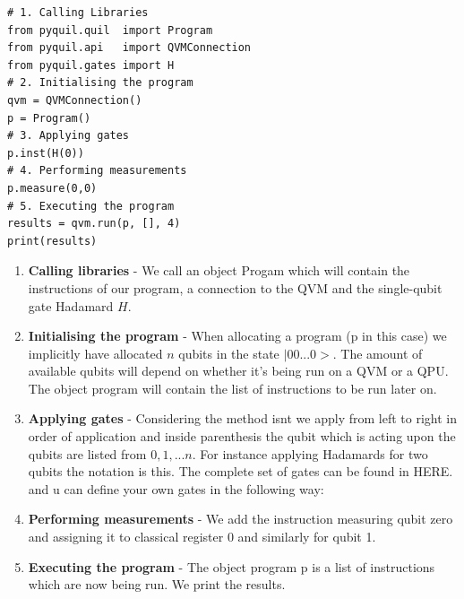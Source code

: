 \noindent \begin{minipage}{0.45\textwidth}
\begin{verbatim}
# 1. Calling Libraries
from pyquil.quil  import Program 
from pyquil.api   import QVMConnection 
from pyquil.gates import H
# 2. Initialising the program
qvm = QVMConnection()
p = Program()
# 3. Applying gates
p.inst(H(0))
# 4. Performing measurements
p.measure(0,0)
# 5. Executing the program
results = qvm.run(p, [], 4)
print(results)
\end{verbatim}
\end{minipage} \hfill
%
\begin{minipage}{0.55\textwidth}
\begin{enumerate}
    \item \textbf{Calling libraries} - We call an object Progam which will contain the instructions of our program, a connection to the QVM and the single-qubit gate Hadamard $H$. 
    \item \textbf{Initialising the program} - When allocating a program (p in this case) we implicitly have allocated $n$  qubits in the state $|00...0>$. The amount of available qubits will depend on whether it's being run on a QVM or a QPU. The object program will contain the list of instructions to be run later on.
\end{enumerate}
\end{minipage}
\begin{enumerate}
\setcounter{enumi}{2}
\item \textbf{Applying gates} - Considering the method isnt we apply from left to right in order of application and inside parenthesis the qubit which is acting upon the qubits are listed from $0,1,...n$. For instance applying Hadamards for two qubits the notation is this. The complete set of gates can be found in HERE. and u can define your own gates in the following way:
    \item \textbf{Performing measurements} - We add the instruction measuring qubit zero and assigning it to classical register 0 and similarly for qubit 1.
    \item \textbf{Executing the program} - The object program p is a list of instructions which are now being run. We print the results.
\end{enumerate}


